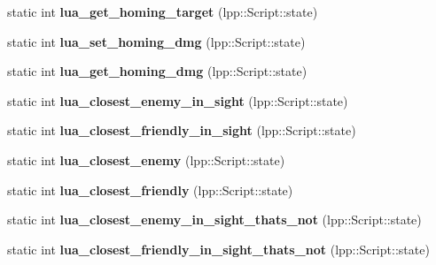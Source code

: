 \begin{DoxyCompactItemize}
\item 
static int {\bfseries lua\+\_\+get\+\_\+homing\+\_\+target} (lpp\+::\+Script\+::state)\hypertarget{class_lua_interface_a14f054fde7343964b7a5b32bbfb1facc}{}\label{class_lua_interface_a14f054fde7343964b7a5b32bbfb1facc}

\item 
static int {\bfseries lua\+\_\+set\+\_\+homing\+\_\+dmg} (lpp\+::\+Script\+::state)\hypertarget{class_lua_interface_a6cc737712c02047deec3478c5efdf789}{}\label{class_lua_interface_a6cc737712c02047deec3478c5efdf789}

\item 
static int {\bfseries lua\+\_\+get\+\_\+homing\+\_\+dmg} (lpp\+::\+Script\+::state)\hypertarget{class_lua_interface_a2733df56a6d03f25d10ffade31315167}{}\label{class_lua_interface_a2733df56a6d03f25d10ffade31315167}

\item 
static int {\bfseries lua\+\_\+closest\+\_\+enemy\+\_\+in\+\_\+sight} (lpp\+::\+Script\+::state)\hypertarget{class_lua_interface_aa4934af8edb7debfe08c82f78c734d3b}{}\label{class_lua_interface_aa4934af8edb7debfe08c82f78c734d3b}

\item 
static int {\bfseries lua\+\_\+closest\+\_\+friendly\+\_\+in\+\_\+sight} (lpp\+::\+Script\+::state)\hypertarget{class_lua_interface_ab8ae4a74f77157cfe1a27738e5859ea3}{}\label{class_lua_interface_ab8ae4a74f77157cfe1a27738e5859ea3}

\item 
static int {\bfseries lua\+\_\+closest\+\_\+enemy} (lpp\+::\+Script\+::state)\hypertarget{class_lua_interface_ad51a84c921d73a2d8e758e4e10644411}{}\label{class_lua_interface_ad51a84c921d73a2d8e758e4e10644411}

\item 
static int {\bfseries lua\+\_\+closest\+\_\+friendly} (lpp\+::\+Script\+::state)\hypertarget{class_lua_interface_acf55dc64db6c601845bb2a90bee13cdf}{}\label{class_lua_interface_acf55dc64db6c601845bb2a90bee13cdf}

\item 
static int {\bfseries lua\+\_\+closest\+\_\+enemy\+\_\+in\+\_\+sight\+\_\+thats\+\_\+not} (lpp\+::\+Script\+::state)\hypertarget{class_lua_interface_ab826975a30a95cb206c04534cd97dfee}{}\label{class_lua_interface_ab826975a30a95cb206c04534cd97dfee}

\item 
static int {\bfseries lua\+\_\+closest\+\_\+friendly\+\_\+in\+\_\+sight\+\_\+thats\+\_\+not} (lpp\+::\+Script\+::state)\hypertarget{class_lua_interface_ae433baf30d9387feab209e0736520a84}{}\label{class_lua_interface_ae433baf30d9387feab209e0736520a84}


\end{DoxyCompactItemize}
